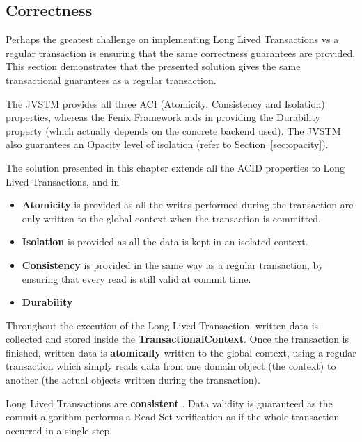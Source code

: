 \subsection{Correctness}

Perhaps the greatest challenge on implementing Long Lived Transactions
vs a regular transaction is ensuring that the same correctness
guarantees are provided. This section demonstrates that the presented
solution gives the same transactional guarantees as a regular transaction.

The JVSTM provides all three ACI (Atomicity, Consistency and
Isolation) properties, whereas the Fenix Framework aids in providing
the Durability property (which actually depends on the concrete
backend used). The JVSTM also guarantees an Opacity level of
isolation (refer to Section~\ref{sec:opacity}).

The solution presented in this chapter extends all the ACID properties
to Long Lived Transactions, and in 



\begin{itemize}

\item {\bf Atomicity} is provided as all the writes performed during
  the transaction are only written to the global context when the
  transaction is committed.

\item {\bf Isolation} is provided as all the data is kept in an
  isolated context.

\item {\bf Consistency} is provided in the same way as a regular
  transaction, by ensuring that every read is still valid at commit
  time.

\item {\bf Durability} 

\end{itemize}

Throughout the execution of the Long Lived Transaction, written data
is collected and stored inside the {\bf TransactionalContext}. Once
the transaction is finished, written data is {\bf atomically} written
to the global context, using a regular transaction which simply reads
data from one domain object (the context) to another (the actual
objects written during the transaction).

Long Lived Transactions are {\bf consistent} . Data validity is
guaranteed as the commit algorithm performs a Read Set verification as
if the whole transaction occurred in a single step.

